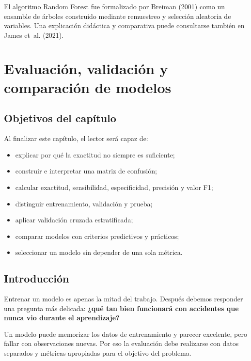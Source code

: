 \documentclass[
  spanish,
  10.5pt,
  letterpaper,
  openany,
  headings=big]{scrbook}
\providecommand{\tightlist}{%
  \setlength{\itemsep}{0pt}\setlength{\parskip}{0pt}}
\begin{document}
El algoritmo Random Forest fue formalizado por Breiman (2001) como un
ensamble de árboles construido mediante remuestreo y selección aleatoria
de variables. Una explicación didáctica y comparativa puede consultarse
también en James et~al. (2021).


\chapter{Evaluación, validación y comparación de
modelos}\label{evaluaciuxf3n-validaciuxf3n-y-comparaciuxf3n-de-modelos}

\section{Objetivos del capítulo}\label{objetivos-del-capuxedtulo-8}

Al finalizar este capítulo, el lector será capaz de:

\begin{itemize}
\tightlist
\item
  explicar por qué la exactitud no siempre es suficiente;
\item
  construir e interpretar una matriz de confusión;
\item
  calcular exactitud, sensibilidad, especificidad, precisión y valor F1;
\item
  distinguir entrenamiento, validación y prueba;
\item
  aplicar validación cruzada estratificada;
\item
  comparar modelos con criterios predictivos y prácticos;
\item
  seleccionar un modelo sin depender de una sola métrica.
\end{itemize}

\section{Introducción}\label{introducciuxf3n-4}

Entrenar un modelo es apenas la mitad del trabajo. Después debemos
responder una pregunta más delicada: \textbf{¿qué tan bien funcionará
con accidentes que nunca vio durante el aprendizaje?}

Un modelo puede memorizar los datos de entrenamiento y parecer
excelente, pero fallar con observaciones nuevas. Por eso la evaluación
debe realizarse con datos separados y métricas apropiadas para el
objetivo del problema.
\end{document}
